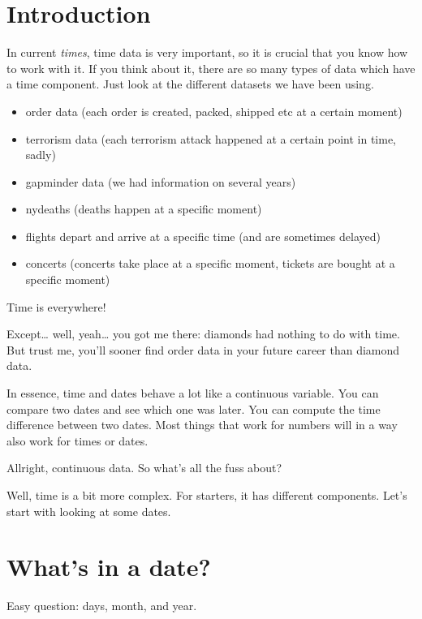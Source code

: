 \documentclass[]{tufte-book}
\providecommand{\tightlist}{%
  \setlength{\itemsep}{0pt}\setlength{\parskip}{0pt}}
\begin{document}
\hypertarget{introduction-3}{%
\section{Introduction}\label{introduction-3}}

In current \emph{times}, time data is very important, so it is crucial that you know how to work with it. If you think about it, there are so many types of data which have a time component. Just look at the different datasets we have been using.

\begin{itemize}
\tightlist
\item
  order data (each order is created, packed, shipped etc at a certain moment)
\item
  terrorism data (each terrorism attack happened at a certain point in time, sadly)
\item
  gapminder data (we had information on several years)
\item
  nydeaths (deaths happen at a specific moment)
\item
  flights depart and arrive at a specific time (and are sometimes delayed)
\item
  concerts (concerts take place at a specific moment, tickets are bought at a specific moment)
\end{itemize}

Time is everywhere!

Except\ldots{} well, yeah\ldots{} you got me there: diamonds had nothing to do with time. But trust me, you'll sooner find order data in your future career than diamond data.

In essence, time and dates behave a lot like a continuous variable. You can compare two dates and see which one was later. You can compute the time difference between two dates. Most things that work for numbers will in a way also work for times or dates.

Allright, continuous data. So what's all the fuss about?

Well, time is a bit more complex. For starters, it has different components. Let's start with looking at some dates.

\hypertarget{whats-in-a-date}{%
\section{What's in a date?}\label{whats-in-a-date}}

Easy question: days, month, and year.
\end{document}
